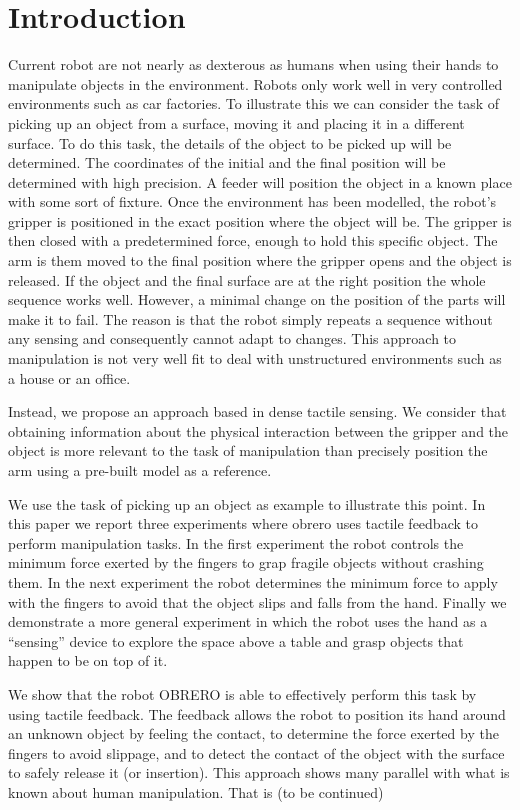 \section{Introduction}
%
Current robot are not nearly as dexterous as humans when using
their hands to manipulate objects in the environment. Robots only
work well in very controlled environments such as car factories.
To illustrate this we can consider the task of picking up an
object from a surface, moving it and placing it in a different
surface. To do this task, the details of the object to be picked
up will be determined. The coordinates of the initial and the
final position will be determined with high precision. A feeder
will position the object in a known place with some sort of
fixture. Once the environment has been modelled, the robot's
gripper is positioned in the exact position where the object will
be. The gripper is then closed with a predetermined force, enough
to hold this specific object. The arm is them moved to the final
position where the gripper opens and the object is released. If
the object and the final surface are at the right position the
whole sequence works well.
%
However, a minimal change on the position of the parts will make
it to fail. The reason is that the robot simply repeats a sequence
without any sensing and consequently cannot adapt to changes.
%
This approach to manipulation is not very well fit to deal with
unstructured environments such as a house or an office.

Instead, we propose an approach based in dense tactile sensing. We
consider that obtaining information about the physical interaction
between the gripper and the object is more relevant to the task of
manipulation than precisely position the arm using a pre-built
model as a reference.

We use the task of picking up an object as example to illustrate
this point. In this paper we report three experiments where obrero
uses tactile feedback to perform manipulation tasks. In the 
first experiment the robot controls the minimum force exerted by the 
fingers to grap fragile objects without crashing them. In the 
next experiment the robot determines the minimum force to apply 
with the fingers to avoid that the object slips and falls from the 
hand. Finally we demonstrate a more general experiment in which 
the robot uses the hand as a ``sensing'' device to explore the 
space above a table and grasp objects that happen to be on top 
of it.

We show that the robot OBRERO is able to effectively
perform this task by using tactile feedback. The feedback allows
the robot to position its hand around an unknown object by feeling
the contact, to determine the force exerted by the fingers to
avoid slippage, and to detect the contact of the object with the
surface to safely release it (or insertion).
%
This approach shows many parallel with what is known about human
manipulation. That is (to be continued)
